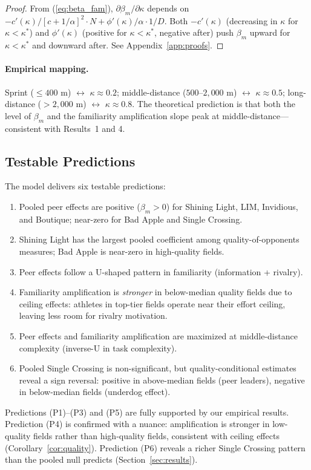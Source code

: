 \documentclass[12pt]{article}
\theoremstyle{definition}
\theoremstyle{remark}
\begin{document}
\begin{proof}
From (\ref{eq:beta_fam}), $\partial\beta_m/\partial\kappa$ depends on
$-c'(\kappa)/[c+1/\alpha]^2 \cdot N + \phi'(\kappa)/\alpha \cdot 1/D$.
Both $-c'(\kappa)$ (decreasing in $\kappa$ for $\kappa < \kappa^*$) and
$\phi'(\kappa)$ (positive for $\kappa < \kappa^*$, negative after) push
$\beta_m$ upward for $\kappa < \kappa^*$ and downward after.
See Appendix~\ref{app:proofs}.
\end{proof}

\paragraph{Empirical mapping.}
Sprint ($\le 400$ m) $\leftrightarrow$ $\kappa \approx 0.2$;
middle-distance ($500$--$2{,}000$ m) $\leftrightarrow$ $\kappa \approx 0.5$;
long-distance ($> 2{,}000$ m) $\leftrightarrow$ $\kappa \approx 0.8$.
The theoretical prediction is that both the level of $\beta_m$ and the familiarity
amplification slope peak at middle-distance---consistent with Results~1 and 4.

\subsection{Testable Predictions}
\label{subsec:preds}

The model delivers six testable predictions:
\begin{enumerate}[label=(P\arabic*),leftmargin=0.65in]
\item Pooled peer effects are positive ($\beta_m > 0$) for Shining Light,
      LIM, Invidious, and Boutique; near-zero for Bad Apple and Single Crossing.
\item Shining Light has the largest pooled coefficient among quality-of-opponents
      measures; Bad Apple is near-zero in high-quality fields.
\item Peer effects follow a U-shaped pattern in familiarity (information + rivalry).
\item Familiarity amplification is \textit{stronger} in below-median quality
      fields due to ceiling effects: athletes in top-tier fields operate near
      their effort ceiling, leaving less room for rivalry motivation.
\item Peer effects and familiarity amplification are maximized at middle-distance
      complexity (inverse-U in task complexity).
\item Pooled Single Crossing is non-significant, but quality-conditional
      estimates reveal a sign reversal: positive in above-median fields
      (peer leaders), negative in below-median fields (underdog effect).
\end{enumerate}
Predictions (P1)--(P3) and (P5) are fully supported by our empirical results.
Prediction (P4) is confirmed with a nuance: amplification is stronger in
low-quality fields rather than high-quality fields, consistent with ceiling effects
(Corollary~\ref{cor:quality}).
Prediction (P6) reveals a richer Single Crossing pattern than the pooled null
predicts (Section~\ref{sec:results}).
\end{document}
